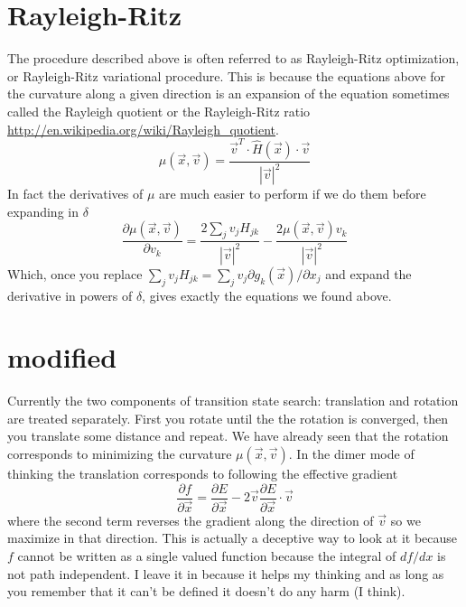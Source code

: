 \documentclass[a4paper]{article}
\begin{document}
\section{Rayleigh-Ritz}
The procedure described above is often referred to as Rayleigh-Ritz
optimization, or Rayleigh-Ritz variational procedure.  This is because the
equations above for the curvature along a given direction is an expansion of
the equation sometimes called the Rayleigh quotient or the Rayleigh-Ritz ratio
\url{http://en.wikipedia.org/wiki/Rayleigh_quotient}. 
\begin{equation}
  \mu(\vec{x}, \vec{v}) = \frac{\vec{v}^T \cdot \hat{H}(\vec{x}) \cdot \vec{v}  }{ | \vec{v} |^2}
\end{equation}
In fact the derivatives of $\mu$ are much easier to perform if we do them
before expanding in $\delta$
\begin{equation}
\frac{\partial \mu(\vec{x}, \vec{v})} {\partial v_k} = 
\frac{ 2 \sum_j v_j H_{jk}}{|\vec{v}|^2}
-
\frac{2 \mu(\vec{x}, \vec{v}) v_k}{|\vec{v}|^2}
\end{equation}
Which, once you replace $\sum_j v_j H_{jk} =  \sum_j v_j \partial g_k(\vec{x})
/ \partial x_j$ and expand the derivative in powers of $\delta$, gives exactly
the equations we found above.


\section{modified}

Currently the two components of transition state search: translation and rotation are treated separately.
First you rotate until the the rotation is converged, then you translate some distance and repeat.
We have already seen that the rotation corresponds to minimizing the curvature $\mu(\vec{x}, \vec{v})$.
In the dimer mode of thinking the translation corresponds to following the effective gradient
\begin{equation}
\frac{\partial f}{\partial \vec{x}} = \frac{\partial E}{\partial \vec{x}} - 2 \vec{v} \frac{\partial E}{\partial \vec{x}} \cdot \vec{v}
\end{equation}
where the second term reverses the gradient along the direction of $\vec{v}$ so we maximize in that direction.  This
is actually a deceptive way to look at it because $f$ cannot be written as a single valued function because the integral of 
$df/dx$ is not path independent.  I leave it in because it helps my thinking and as long as you remember that it can't be defined
it doesn't do any harm (I think).
\end{document}
